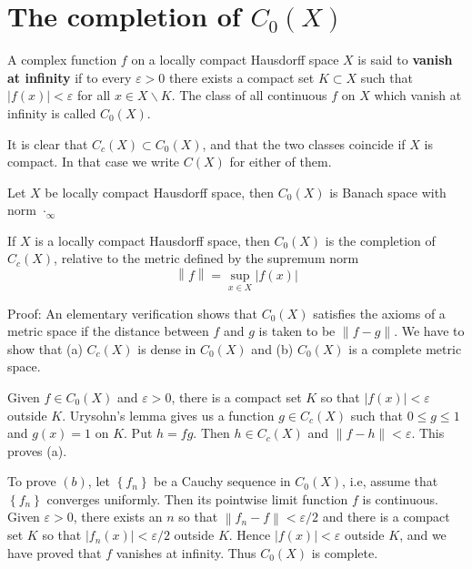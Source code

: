 \documentclass[12pt, a4paper, oneside]{book}
\begin{document}
\section{The completion of \texorpdfstring{$C_0(X)$}{}}
\begin{definition}
    A complex function $f$ on a locally compact Hausdorff space $X$ is said to \textbf{vanish at infinity} if to every $\varepsilon>0$ there exists a compact set $K \subset X$ such that $|f(x)| < \varepsilon$ for all $x \in X \backslash K $. The class of all continuous $f$ on $X$ which vanish at infinity is called $C_{0}(X)$.

    It is clear that $C_{c}(X) \subset C_{0}(X)$, and that the two classes coincide if $X$ is compact. In that case we write $C(X)$ for either of them.
\end{definition}
\begin{theorem}
    Let $X$ be locally compact Hausdorff space, then $C_0(X)$ is Banach space with norm $\cdot_\infty$
\end{theorem}
\begin{theorem}
    If $X$ is a locally compact Hausdorff space, then $C_{0}(X)$ is the completion of $C_{c}(X)$, relative to the metric defined by the supremum norm
    $$
        \left\| f \right\|=\sup _{x \in X} |f(x)|
    $$

    Proof:
    An elementary verification shows that $C_{0}(X)$ satisfies the axioms of a metric space if the distance between $f$ and $g$ is taken to be $\|f-g\|$. We have to show that (a) $C_{c}(X)$ is dense in $C_{0}(X)$ and (b) $ C_{0}(X)$ is a complete metric space.

    Given $f \in C_{0}(X)$ and $\varepsilon > 0$, there is a compact set $K$ so that $|f(x)| < \varepsilon$ outside $K$. Urysohn's lemma gives us a function $g \in C_{c}(X)$ such that $0 \leq g \leq 1$ and $g(x)=1$ on $K$. Put $h=f g$. Then $h \in C_{c}(X)$ and $\|f-h\|<\varepsilon$. This proves (a).

    To prove $(b)$, let $\left\{f_{n}\right\}$ be a Cauchy sequence in $C_{0}(X)$, i.e, assume that $\left\{f_{n}\right\}$ converges uniformly. Then its pointwise limit function $f$ is continuous. Given $\varepsilon>0$, there exists an $n$ so that $\left\|f_{n}-f\right\|<\varepsilon / 2$ and there is a compact set $K$ so that $\left|f_{n}(x)\right|<\varepsilon / 2$ outside $K$. Hence $|f(x)|<\varepsilon$ outside $K$, and we have proved that $f$ vanishes at infinity. Thus $C_{0}(X)$ is complete.
\end{theorem}
\end{document}
